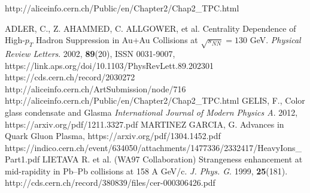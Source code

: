 \documentclass[thesismargins, thesislinespacing]{rnthesis}
\begin{document}
\begin{thebibliography}{}
http://aliceinfo.cern.ch/Public/en/Chapter2/Chap2\_TPC.html

ADLER, C., Z. AHAMMED, C. ALLGOWER, et al. Centrality Dependence of High-$p_T$ Hadron Suppression in Au+Au Collisions at $\sqrt{s_{NN}} = 130$ GeV. \textit{Physical Review Letters}. 2002, \textbf{89}(20), ISSN 0031-9007, https://link.aps.org/doi/10.1103/PhysRevLett.89.202301
https://cds.cern.ch/record/2030272
http://aliceinfo.cern.ch/ArtSubmission/node/716
http://aliceinfo.cern.ch/Public/en/Chapter2/Chap2\_TPC.html
GELIS, F., Color glass condensate and Glasma \textit{International Journal of Modern Physics A}. 2012, https://arxiv.org/pdf/1211.3327.pdf
MARTINEZ GARCIA, G. Advances in Quark Gluon Plasma, https://arxiv.org/pdf/1304.1452.pdf
https://indico.cern.ch/event/634050/attachments/1477336/2332417/HeavyIons\_Part1.pdf
LIETAVA R.  et al. (WA97 Collaboration) Strangeness enhancement at mid-rapidity in Pb–Pb collisions at 158 A GeV/c. \textit{J. Phys. G}. 1999,  \textbf{25}(181). http://cds.cern.ch/record/380839/files/cer-000306426.pdf 
\end{thebibliography}
%
\end{document}
